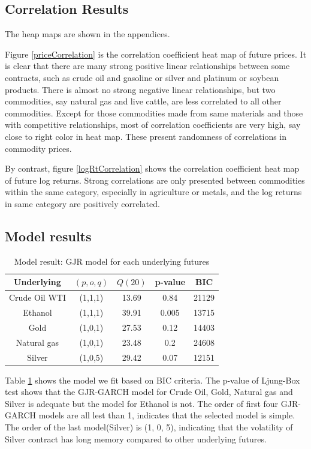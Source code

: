 \documentclass[10pt, a4paper, twocolumn]{article} %
\begin{document}
\subsection{Correlation Results}

The heap maps are shown in the appendices.

Figure \ref{priceCorrelation} is the correlation coefficient heat map of future prices. It is clear that there are many strong positive linear relationships between some contracts, such as crude oil and gasoline or silver and platinum or soybean products. There is almost no strong negative linear relationships, but two commodities, say natural gas and live cattle, are less correlated to all other commodities. Except for those commodities made from same materials and those with competitive relationships, most of correlation coefficients are very high, say close to right color in heat map. These present randomness of correlations in commodity prices.

By contrast, figure \ref{logRtCorrelation} shows the correlation coefficient heat map of future log returns. Strong correlations are only presented between commodities within the same category, especially in agriculture or metals, and the log returns in same category are positively correlated.

\subsection{Model results}

\begin{table}[!ht]
\centering
\small
\begin{tabular}{ccccc}
\toprule
Underlying & $ (p, o, q) $ & $ Q(20) $ & p-value & BIC \\
\midrule
Crude Oil WTI & (1,1,1) & 13.69 & 0.84 & 21129 \\
Ethanol & (1,1,1) & 39.91 & 0.005 & 13715 \\
Gold & (1,0,1) & 27.53 & 0.12 & 14403  \\
Natural gas & (1,0,1) & 23.48 & 0.2 & 24608 \\
Silver & (1,0,5) & 29.42 & 0.07 & 12151 \\
\bottomrule
\end{tabular}
\caption{Model result: GJR model for each underlying futures}
\label{model result}
\end{table}

Table \ref{model result} shows the model we fit based on BIC criteria. The p-value of Ljung-Box test shows that the GJR-GARCH model for Crude Oil, Gold, Natural gas and Silver is adequate but the model for Ethanol is not. The order of first four GJR-GARCH models are all lest than 1, indicates that the selected model is simple. The order of the last model(Silver) is (1, 0, 5), indicating that the volatility of Silver contract has long memory compared to other underlying futures.
\end{document}
